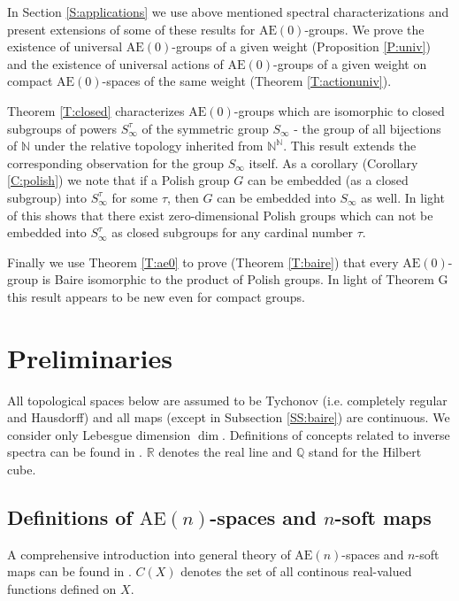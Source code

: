\documentclass[12pt,draft]{amsart}
\theoremstyle{plain}
\theoremstyle{definition}
\numberwithin{equation}{section}
\begin{document}
In Section \ref{S:applications} we use above mentioned spectral
characterizations and present extensions of some of these results
for $\text{AE}(0)$-groups. We prove the existence of  universal
$\text{AE}(0)$-groups of a given weight (Proposition \ref{P:univ})
and the existence of universal actions of
$\text{AE}(0)$-groups of a given weight 
on compact $\text{AE}(0)$-spaces of the same
weight (Theorem \ref{T:actionuniv}).  

Theorem \ref{T:closed} characterizes $\text{AE}(0)$-groups which
are isomorphic to closed subgroups of powers $S_{\infty}^{\tau}$ of 
the symmetric group $S_{\infty}$ - the group
of all bijections of ${\mathbb N}$ under the relative topology
inherited from ${\mathbb N}^{\mathbb N}$. This result extends the
corresponding observation \cite[Theorem 1.5.1]{bekech96} for the
group $S_{\infty}$ itself. As a corollary (Corollary
\ref{C:polish}) we note that if a
Polish group $G$ can be embedded (as a closed subgroup) into
$S_{\infty}^{\tau}$ for some $\tau$, then $G$ can be embedded
into $S_{\infty}$ as well. In light of
\cite{dough94} this shows that there exist zero-dimensional
Polish groups
which can not be embedded into $S_{\infty}^{\tau}$ as closed
subgroups for any cardinal number $\tau$.

Finally we use Theorem \ref{T:ae0} to prove (Theorem \ref{T:baire})
that every $\text{AE}(0)$-group is Baire isomorphic to the product of Polish groups.
In light of Theorem G this result appears to be new even for compact groups.









\section{Preliminaries}\label{S:pre}
All topological spaces below are assumed to be Tychonov (i.e.
completely regular and Hausdorff) and all maps (except
in Subsection \ref{SS:baire}) are continuous. We consider
only Lebesgue dimension $\dim$. Definitions of concepts related to inverse spectra
can be found in \cite{chibook96}. ${\mathbb R}$
denotes the real line and ${\mathbb Q}$ stand for the Hilbert cube.

\subsection{Definitions of $\text{AE}(n)$-spaces and $n$-soft maps}\label{SS:aen}
A comprehensive introduction into general theory
of $\text{AE}(n)$-spaces and $n$-soft maps can be found in \cite{chibook96}.
$C(X)$ denotes the set of all continous real-valued functions defined on $X$.
\end{document}
